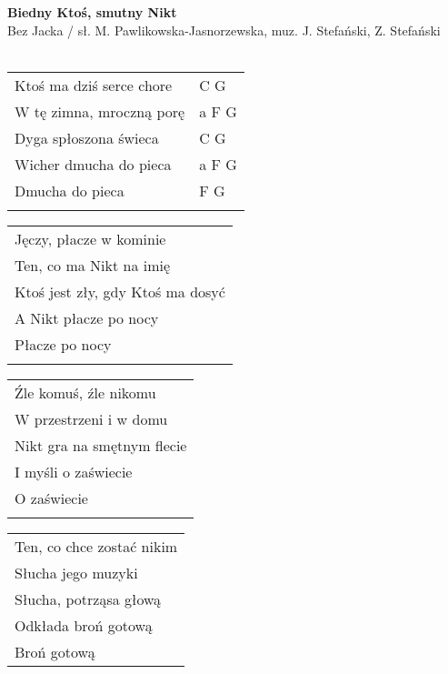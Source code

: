 \documentclass[a5paper]{article}
\begin{document}


\noindent
\fontsize{12pt}{15pt}\selectfont
\textbf{Biedny Ktoś, smutny Nikt} \\
\fontsize{8pt}{10pt}\selectfont
Bez Jacka / sł. M. Pawlikowska-Jasnorzewska, muz. J. Stefański, Z. Stefański \\ \\
\fontsize{10pt}{12pt}\selectfont
{}
\begin{tabular}{@{}p{7cm}p{3cm}@{}}
\noindent
Ktoś ma dziś serce chore & C G \\
W tę zimna, mroczną porę & a F G \\
Dyga spłoszona świeca & C G \\
Wicher dmucha do pieca & a F G \\
Dmucha do pieca & F G \\ \\
\end{tabular}

\noindent
\begin{tabular}{@{}p{9.5cm}@{}}
Jęczy, płacze w kominie \\
Ten, co ma Nikt na imię \\
Ktoś jest zły, gdy Ktoś ma dosyć \\
A Nikt płacze po nocy \\
Płacze po nocy \\ \\
\end{tabular}

\noindent
\begin{tabular}{@{}p{9.5cm}@{}}
Źle komuś, źle nikomu \\
W przestrzeni i w domu \\
Nikt gra na smętnym flecie \\
I myśli o zaświecie \\ 
O zaświecie \\ \\
\end{tabular}

\noindent
\begin{tabular}{@{}p{9.5cm}@{}}
Ten, co chce zostać nikim \\ 
Słucha jego muzyki \\
Słucha, potrząsa głową \\
Odkłada broń gotową \\
Broń gotową
\end{tabular}
\end{document}
